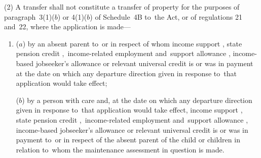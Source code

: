 \documentclass[12pt,a4paper]{article}
\begin{document}
(2) A transfer shall not constitute a transfer of property for the purposes of paragraph~3(1)($b$) or 4(1)($b$) of Schedule~4B to~the Act, or of regulations 21 and~22, where the application is made—
\begin{enumerate}\item[]
($a$) by an absent parent to~or in respect of whom income support%
, state pension credit%
,~income-related employment and~support allowance%
, income-based jobseeker’s allowance or relevant universal credit  %
is or was in payment at the date on which any departure direction given in response to~that application would take effect;

($b$) by a person with care and, at the date on which any departure direction given in response to~that application would take effect, income support%
, state pension credit%
,~income-related employment and~support allowance%
, income-based jobseeker’s allowance or relevant universal credit  %
is or was in payment to~or in respect of the absent parent of the child or children in relation to~whom the maintenance assessment in question is made.
\end{enumerate}
\end{document}
